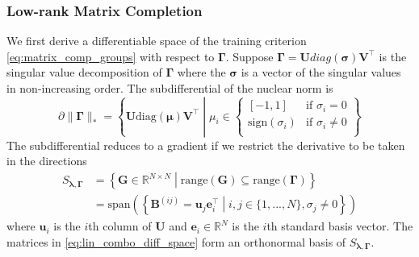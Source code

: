 \documentclass[12pt,letterpaper]{article}
\begin{document}
\subsubsection{Low-rank Matrix Completion}
We first derive a differentiable space of the training criterion \eqref{eq:matrix_comp_groups} with respect to $\boldsymbol{\Gamma}$. 
Suppose $\boldsymbol{\Gamma} = \boldsymbol{U}diag(\boldsymbol{\sigma}) \boldsymbol{V}^\top$ is the singular value decomposition of $\boldsymbol{\Gamma}$ where the $\boldsymbol{\sigma}$ is a vector of the singular values in non-increasing order. The subdifferential of the nuclear norm is \citep{parikh2014proximal}
\begin{equation}
\partial \| \boldsymbol{\Gamma} \|_* = 
\left \{
\boldsymbol{U} \text{diag}(\boldsymbol{\mu}) \boldsymbol{V}^\top \middle | 
\mu_i \in 
\begin{cases}
[-1, 1] & \text{if } \sigma_i = 0\\
\text{sign}(\sigma_i) & \text{if } \sigma_i \ne 0\\
\end{cases}
\right \}
\end{equation}
The subdifferential reduces to a gradient if we restrict the derivative to be taken in the directions
\begin{align}
S_{\boldsymbol{\lambda}, \boldsymbol{\Gamma}} & =  \left \{
\boldsymbol{G} \in \mathbb{R}^{N\times N}
\middle |
\text{range}(\boldsymbol{G}) \subseteq \text{range}(\boldsymbol{\Gamma})
\right \} \\
& = 
\text{span}
\left (
\left \{
\boldsymbol{B}^{(ij)} = \boldsymbol{u}_j \boldsymbol{e}_i^\top
\middle | 
i,j  \in \{1,...,N\},
\sigma_j \ne 0
\right \}
\right )
\label{eq:lin_combo_diff_space}
\end{align}
where $\boldsymbol{u}_i$ is the $i$th column of $\boldsymbol{U}$ and $\boldsymbol{e}_i \in \mathbb{R}^N$ is the $i$th standard basis vector. The matrices in \eqref{eq:lin_combo_diff_space} form an orthonormal basis of $S_{\boldsymbol{\lambda}, \boldsymbol{\Gamma}}$.
\end{document}
